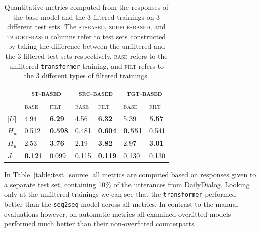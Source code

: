 \documentclass[11pt,a4paper]{article}
\begin{document}
\begin{table}[t!]
	\small
	\begin{center}
		\begin{tabular}{lllllll}
			 & \multicolumn{2}{c}{\textsc{st-based}} & \multicolumn{2}{c}{\textsc{src-based}}  & \multicolumn{2}{c}{\textsc{tgt-based}} \\ \hline
			 & \textsc{base} & \textsc{filt} & \textsc{base} & \textsc{filt} & \textsc{base} & \textsc{filt} \\ \hline 
			\(|U|\) & 4.94 & \bf6.29 & 4.56 & \bf6.32 & 5.39 & \bf5.57 \\
			\(H_w\) & 0.512 & \bf0.598 & 0.481 & \bf0.604 & \bf0.551 & 0.541 \\
			\(H_u\) & 2.53 & \bf3.76 & 2.19 & \bf3.82 & 2.97 & \bf3.01 \\
			\(J\) & \bf0.121 & 0.099 & 0.115 & \bf0.119 & 0.130 & 0.130 \\
			
			
			
		\end{tabular}
	\end{center}
	\caption{\label{table:difference_source} Quantitative metrics computed from the responses of the base model and the 3 filtered trainings on 3 different test sets. The \textsc{st-based}, \textsc{source-based}, and \textsc{target-based} columns refer to test sets constructed by taking the difference between the unfiltered and the 3 filtered test sets respectively. \textsc{base} refers to the unfiltered \texttt{transformer} training, and \textsc{filt} refers to the 3 different types of filtered trainings.}
\end{table}

In Table~\ref{table:test_source} all metrics are computed based on responses given to a separate test set, containing 10\(\%\) of the utterances from DailyDialog. Looking only at the unfiltered trainings we can see that the \texttt{transformer} performed better than the \texttt{seq2seq} model across all metrics. In contrast to the manual evaluations however, on automatic metrics all examined overfitted models performed much better than their non-overfitted counterparts.
\end{document}
